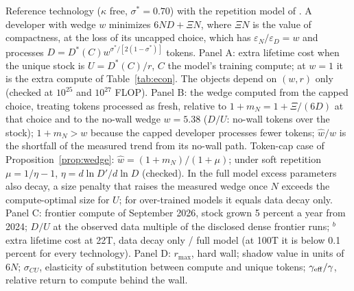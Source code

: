 \begin{table}[tp]
\vspace{2pt}
\begin{tablenotes}[Notes]
Reference technology ($\kappa$ free, $\sigma^*=0.70$) with the repetition model of \citet{muennighoff2023scaling}. A developer with wedge $w$ minimizes $6ND+\Xi N$, where $\Xi N$ is the value of compactness, at the loss of its uncapped choice, which has $\varepsilon_N/\varepsilon_D=w$ and processes $D=D^*(C)w^{\sigma^*/[2(1-\sigma^*)]}$ tokens. Panel A: extra lifetime cost when the unique stock is $U=D^*(C)/r$, $C$ the model's training compute; at $w=1$ it is the extra compute of Table~\ref{tab:econ}. The objects depend on $(w,r)$ only (checked at $10^{25}$ and $10^{27}$ FLOP). Panel B: the wedge computed from the capped choice, treating tokens processed as fresh, relative to $1+m_N=1+\Xi/(6D)$ at that choice and to the no-wall wedge $w=5.38$ ($D/U$: no-wall tokens over the stock); $1+m_N>w$ because the capped developer processes fewer tokens; $\hat w/w$ is the shortfall of the measured trend from its no-wall path. Token-cap case of Proposition~\ref{prop:wedge}: $\hat w=(1+m_N)/(1+\mu)$; under soft repetition $\mu=1/\eta-1$, $\eta=d\ln D'/d\ln D$ (checked). In the full model excess parameters also decay, a size penalty that raises the measured wedge once $N$ exceeds the compute-optimal size for $U$; for over-trained models it equals data decay only. Panel C: frontier compute of September 2026, stock grown 5 percent a year from 2024; $D/U$ at the observed data multiple of the disclosed dense frontier runs; $^b$extra lifetime cost at 22T, data decay only / full model (at 100T it is below 0.1 percent for every technology). Panel D: $r_{\max}$, hard wall; shadow value in units of $6N$; $\sigma_{CU}$, elasticity of substitution between compute and unique tokens; $\gamma_{\rm eff}/\gamma$, relative return to compute behind the wall.
\end{tablenotes}
\end{table}

